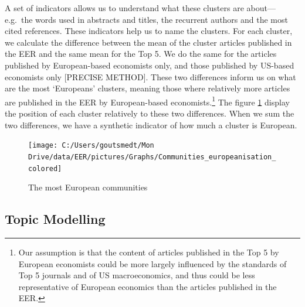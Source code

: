 \documentclass[]{elsarticle} %
\begin{document}
A set of indicators allows us to understand what these clusters are
about---e.g.~the words used in abstracts and titles, the recurrent
authors and the most cited references. These indicators help us to name
the clusters. For each cluster, we calculate the difference between the
mean of the cluster articles published in the EER and the same mean for
the Top 5. We do the same for the articles published by European-based
economists only, and those published by US-based economists only
{[}PRECISE METHOD{]}. These two differences inform us on what are the
most `Europeans' clusters, meaning those where relatively more articles
are published in the EER by European-based economists.\footnote{Our
  assumption is that the content of articles published in the Top 5 by
  European economists could be more largely influenced by the standards
  of Top 5 journals and of US macroeconomics, and thus could be less
  representative of European economics than the articles published in
  the EER.} The figure \ref{fig:plot-community-diff} display the
position of each cluster relatively to these two differences. When we
sum the two differences, we have a synthetic indicator of how much a
cluster is European.

\begin{figure}[h]

{\centering \texttt{[image: C:/Users/goutsmedt/Mon Drive/data/EER/pictures/Graphs/Communities\_europeanisation\_colored]} 

}

\caption{The most European communities}\label{fig:plot-community-diff}
\end{figure}

\hypertarget{topic-modelling}{%
\subsection{Topic Modelling}\label{topic-modelling}}
\end{document}
